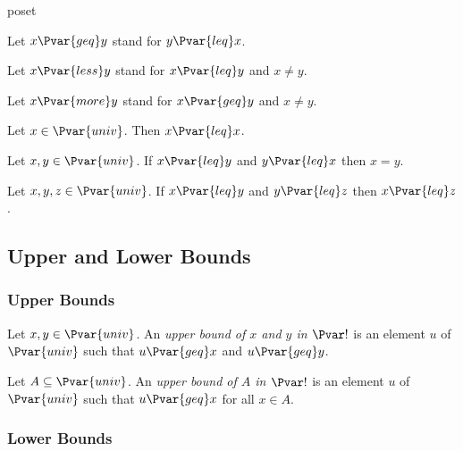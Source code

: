 \documentclass{stex}
\begin{document}
\begin{smodule}{poset}
\begin{forthel}
    Let $x {\Pvar{geq}} y$ stand for $y {\Pvar{leq}} x$.

    Let $x {\Pvar{less}} y$ stand for $x {\Pvar{leq}} y$ and $x\neq y$.

    Let $x {\Pvar{more}} y$ stand for $x {\Pvar{geq}} y$ and $x\neq y$.

    \begin{axiom*}[Reflexivity]
      Let $x \in \Pvar{univ}$.
      Then $x {\Pvar{leq}} x$.
    \end{axiom*}

    \begin{axiom*}[Antisymmetry]
      Let $x, y \in \Pvar{univ}$.
      If $x {\Pvar{leq}} y$ and $y {\Pvar{leq}} x$ then $x=y$.
    \end{axiom*}

    \begin{axiom*}[Transitivity]
      Let $x, y, z \in \Pvar{univ}$.
      If $x {\Pvar{leq}} y$ and $y {\Pvar{leq}} z$ then $x {\Pvar{leq}} z$.
    \end{axiom*}
  \end{forthel}

  \subsection{Upper and Lower Bounds}

  \subsubsection{Upper Bounds}

  \begin{forthel}
    \begin{definition*}
      Let $x, y \in \Pvar{univ}$.
      An \emph{upper bound of $x$ and $y$ in $\Pvar!$} is an element $u$ of $\Pvar{univ}$ such that $u {\Pvar{geq}} x$ and $u {\Pvar{geq}} y$.
    \end{definition*}
    
    \begin{definition*}
      Let $A \subseteq \Pvar{univ}$.
      An \emph{upper bound of $A$ in $\Pvar!$} is an element $u$ of $\Pvar{univ}$ such that $u {\Pvar{geq}} x$ for all $x \in A$.
    \end{definition*}
  \end{forthel}

  \subsubsection{Lower Bounds}


\end{smodule}
\end{document}
